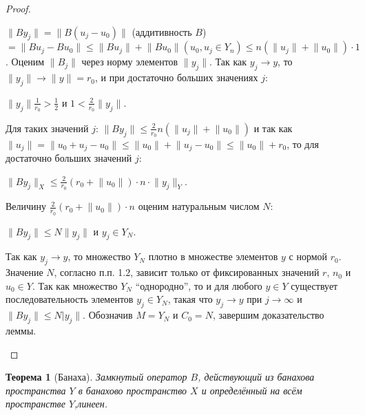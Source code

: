 \documentclass[12pt,a4paper,titlepage, oneside]{book}
\theoremstyle{definition}
\theoremstyle{plain}
\newtheorem*{theorem}{Теорема}
\theoremstyle{remark}
\theoremstyle{remark}
\theoremstyle{remark}
\theoremstyle{remark}
\theoremstyle{plain}
\theoremstyle{plain}
\begin{document}
\begin{proof}
\begin{enumerate}
$\lVert By_j\rVert = \lVert B(u_j - u_0)\rVert$ (аддитивность $B$) $ = \lVert Bu_j - Bu_0\rVert \le \lVert Bu_j\rVert + \lVert Bu_0\rVert(u_0, u_j \in Y_n) \le n(\lVert u_j\rVert + \lVert u_0\rVert)\cdot 1$.
Оценим $\lVert B_j\rVert$ через норму элементов $\lVert y_j\rVert$. Так как $y_j \to y$, то $\lVert y_j\rVert \to \lVert y\rVert=r_0$, и при достаточно больших значениях $j$:

\begin{center}
$\lVert y_j\rVert\frac{1}{r_0}>\frac12$ и $1<\frac{2}{r_0}\lVert y_j\rVert$.
\end{center}

Для таких значений $j$: $\lVert By_j\rVert\le\frac{2}{r_0}n(\lVert u_j\rVert + \lVert u_0\rVert)$ и так как $\lVert u_j\rVert = \lVert u_0 + u_j - u_0\rVert \le \lVert u_0\rVert + \lVert u_j - u_0\rVert \le \lVert u_0\rVert + r_0$, то для достаточно больших значений $j$:

\begin{center}
$\lVert By_j\rVert_X \le \frac{2}{r_0}(r_0 + \lVert u_0\rVert)\cdot n\cdot \lVert y_j\rVert_Y$.
\end{center}

Величину $\frac{2}{r_0}(r_0 + \lVert u_0\rVert)\cdot n$ оценим натуральным числом $N$:

\begin{center}
$\lVert By_j\rVert \le N\lVert y_j\rVert$ и $y_j \in Y_N$.
\end{center}

Так как $y_j \to y$, то множество $Y_N$ плотно в множестве элементов $y$ с нормой $r_0$. Значение $N$, согласно п.п. 1.2, зависит только от фиксированных значений $r$, $n_0$ и $u_0 \in Y$. Так как множество $Y_N$ ``однородно'', то и для любого $y \in Y$ существует последовательность элементов $y_j \in Y_N$, такая что $y_j \to y$ при $j \to \infty$ и $\lVert By_j\rVert \le N\lvert y_j\rVert$. Обозначив $M = Y_N$ и $C_0 = N$, завершим доказательство леммы.

\end{enumerate}

\end{proof}

\begin{theorem}[Банаха]
Замкнутый оператор $B$, действующий из банахова пространства $Y$ в банахово пространство $X$ и определённый на всём пространстве $Y$,линеен.
\end{theorem}
\end{document}
